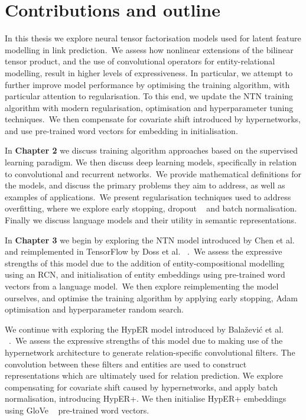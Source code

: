
\section{Contributions and outline} %

\noindent In this thesis we explore neural tensor factorisation models used for latent feature modelling in link prediction.\ We assess how nonlinear extensions of the bilinear tensor product, and the use of convolutional operators for entity-relational modelling, result in higher levels of expressiveness. In particular, we attempt to further improve model performance by optimising the training algorithm, with particular attention to regularisation. To this end, we update the NTN training algorithm with modern regularisation, optimisation and hyperparameter tuning techniques.\ We then compensate for covariate shift introduced by hypernetworks, and use pre-trained word vectors for embedding in initialisation. \par

\noindent In \textbf{Chapter 2} we discuss training algorithm approaches based on the supervised learning paradigm. We then discuss deep learning models, specifically in relation to convolutional and recurrent networks.\ We provide mathematical definitions for the models, and discuss the primary problems they aim to address, as well as examples of applications.\ We present regularisation techniques used to address overfitting, where we explore early stopping, dropout \unskip ~\citep{srivastava2014dropout} and batch normalisation. Finally we discuss language models and their utility in semantic representations. \par

\noindent In \textbf{Chapter 3} we begin by exploring the NTN model introduced by Chen et al. \unskip ~\citep{socher2013reasoning} and reimplemented in TensorFlow by Doss et al. \unskip ~\citep{Doss2015}.\ We assess the expressive strengths of this model due to the addition of entity-compositional modelling using an RCN, and initialisation of entity embeddings using pre-trained word vectors from a language model.\ We then explore reimplementing the model ourselves, and optimise the training algorithm by applying early stopping, Adam optimisation and hyperparameter random search. \par

\noindent We continue with exploring the HypER model introduced by Bala\v{z}evi\'c et al. \unskip ~\citep{balazevic2019hypernetwork}.\ We assess the expressive strengths of this model due to making use of the hypernetwork architecture to generate relation-specific convolutional filters. The convolution between these filters and entities are used to construct representations which are ultimately used for relation prediction. We explore compensating for covariate shift caused by hypernetworks, and apply batch normalisation, introducing HypER+. We then initialise HypER+ embeddings using GloVe \unskip~\citep{pennington2014glove} pre-trained word vectors. \par

